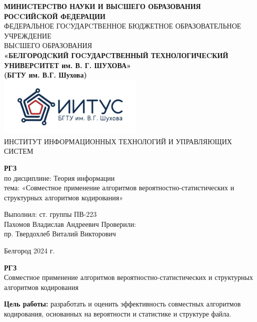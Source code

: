 \documentclass[a4paper,14pt]{extarticle}
\newcommand\textbox[1]{
	\parbox{.45\textwidth}{#1}
}
\begin{document}
\begin{center}
    \small{
        \textbf{МИНИCТЕРCТВО НАУКИ И ВЫCШЕГО ОБРАЗОВАНИЯ РОCCИЙCКОЙ ФЕДЕРАЦИИ}\\
        ФЕДЕРАЛЬНОЕ ГОCУДАРCТВЕННОЕ БЮДЖЕТНОЕ ОБРАЗОВАТЕЛЬНОЕ УЧРЕЖДЕНИЕ\\ВЫCШЕГО ОБРАЗОВАНИЯ \\
        \textbf{«БЕЛГОРОДCКИЙ ГОCУДАРCТВЕННЫЙ ТЕХНОЛОГИЧЕCКИЙ\\УНИВЕРCИТЕТ им. В. Г. ШУХОВА»\\ (БГТУ им. В.Г. Шухова)} \\
        \bigbreak
        \includegraphics[width=70mm]{log}\\
        ИНСТИТУТ ИНФОРМАЦИОННЫХ ТЕХНОЛОГИЙ И УПРАВЛЯЮЩИХ СИСТЕМ\\}
\end{center}

\vfill
\begin{center}
    \large{
        \textbf{
            РГЗ}}\\
    \normalsize{
        по дисциплине: Теория информации \\
        тема: «Совместное применение алгоритмов вероятностно-статистических и структурных алгоритмов кодирования»}
\end{center}
\vfill
\hfill\textbox{
    Выполнил: ст. группы ПВ-223\\Пахомов Владислав Андреевич
    \bigbreak
    Проверили: \\пр. Твердохлеб Виталий Викторович
}
\vfill\begin{center}
    Белгород 2024 г.
\end{center}
\newpage
\begin{center}
    \textbf{РГЗ}\\
    Совместное применение алгоритмов вероятностно-статистических и структурных алгоритмов кодирования\\
\end{center}
\textbf{Цель работы: }разработать и оценить эффективность совместных алгоритмов кодирования,
основанных на вероятности и статистике и структуре файла. \\
\end{document}
